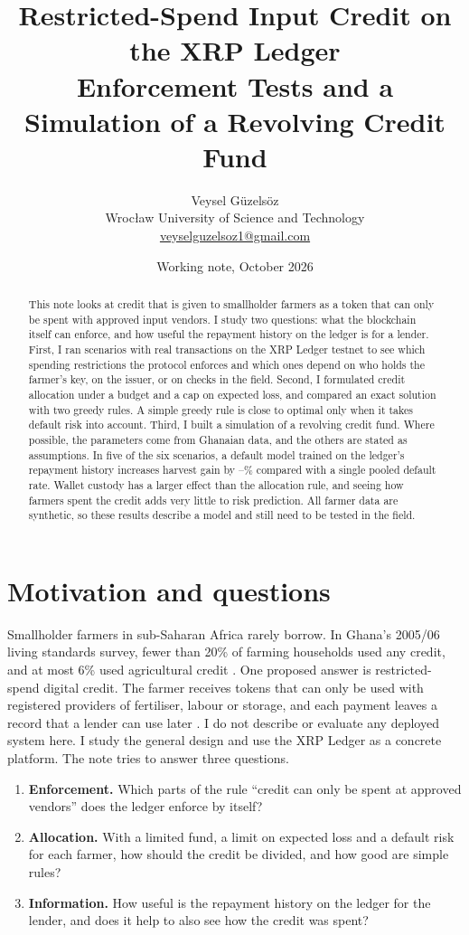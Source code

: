 \documentclass[11pt]{article}
\title{\textbf{Restricted-Spend Input Credit on the XRP Ledger}\\[0.3em]
\large Enforcement Tests and a Simulation of a Revolving Credit Fund}
\author{Veysel G\"uzels\"oz\\
\small Wroc\l{}aw University of Science and Technology\\
\small \href{mailto:veyselguzelsoz1@gmail.com}{veyselguzelsoz1@gmail.com}}
\date{Working note, October 2026}
\begin{document}
\maketitle

\begin{abstract}
\noindent
This note looks at credit that is given to smallholder farmers as a token that can only be
spent with approved input vendors. I study two questions: what the blockchain itself can
enforce, and how useful the repayment history on the ledger is for a lender. First, I ran
\EnfN{} scenarios with real transactions on the XRP Ledger testnet to see which spending
restrictions the protocol enforces and which ones depend on who holds the farmer's key, on
the issuer, or on checks in the field. Second, I formulated credit allocation under a budget
and a cap on expected loss, and compared an exact solution with two greedy rules. A simple
greedy rule is close to optimal only when it takes default risk into account. Third, I built
a simulation of a revolving credit fund. Where possible, the parameters come from Ghanaian
data, and the others are stated as assumptions. In five of the six scenarios, a default model
trained on the ledger's repayment history increases harvest gain by
\LedgerLo--\LedgerHi\% compared with a single pooled default rate. Wallet custody has a larger effect than the allocation rule, and
seeing how farmers spent the credit adds very little to risk prediction. All farmer data are
synthetic, so these results describe a model and still need to be tested in the field.
\end{abstract}

\section{Motivation and questions}

Smallholder farmers in sub-Saharan Africa rarely borrow. In Ghana's 2005/06 living standards
survey, fewer than 20\% of farming households used any credit, and at most 6\% used
agricultural credit \citep{chamberlin2008}. One proposed answer is restricted-spend digital
credit. The farmer receives tokens that can only be used with registered providers of
fertiliser, labour or storage, and each payment leaves a record that a lender can use later
\citep{cted,nyuad2026}. I do not describe or evaluate any deployed system here. I study the
general design and use the XRP Ledger as a concrete platform. The note tries to answer three
questions.

\begin{enumerate}\itemsep0em
\item \textbf{Enforcement.} Which parts of the rule ``credit can only be spent at approved
vendors'' does the ledger enforce by itself?
\item \textbf{Allocation.} With a limited fund, a limit on expected loss and a default risk for
each farmer, how should the credit be divided, and how good are simple rules?
\item \textbf{Information.} How useful is the repayment history on the ledger for the lender,
and does it help to also see how the credit was spent?
\end{enumerate}
\end{document}
